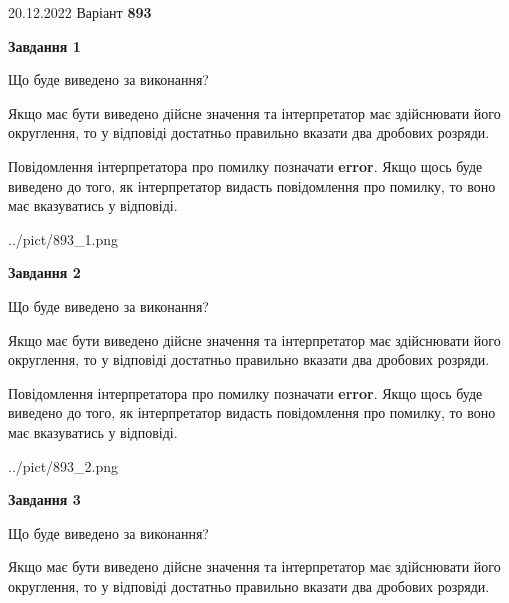 \documentclass[12pt, ukrainian]{article}
\begin{document}
{20.12.2022 Варіант \No \textbf { 893 }\par}
{
\begin {Large}

{\begin {center}\textbf{Завдання 1}\end {center}}\par
Що буде виведено за виконання? \par

Якщо має бути виведено дійсне значення та інтерпретатор має здійснювати його округлення, 
то у відповіді достатньо правильно вказати два дробових розряди.

Повідомлення інтерпретатора про помилку позначати \textbf{error}.
Якщо щось буде виведено до того, як інтерпретатор видасть повідомлення про помилку, 
то воно має вказуватись у відповіді. \par

\begin{center}
	{../pict/893_1.png}
\end{center}
\newpage

{\begin {center}\textbf{Завдання 2}\end {center}}\par
Що буде виведено за виконання? \par

Якщо має бути виведено дійсне значення та інтерпретатор має здійснювати його округлення, 
то у відповіді достатньо правильно вказати два дробових розряди.

Повідомлення інтерпретатора про помилку позначати \textbf{error}.
Якщо щось буде виведено до того, як інтерпретатор видасть повідомлення про помилку, 
то воно має вказуватись у відповіді. \par

\begin{center}
	{../pict/893_2.png}
\end{center}
\newpage

{\begin {center}\textbf{Завдання 3}\end {center}}\par
Що буде виведено за виконання? \par

Якщо має бути виведено дійсне значення та інтерпретатор має здійснювати його округлення, 
то у відповіді достатньо правильно вказати два дробових розряди.


\end{Large}}
\end{document}
